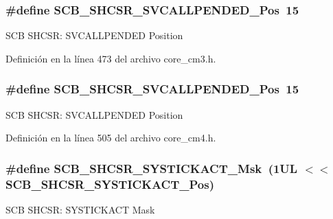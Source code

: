 \subsubsection[{\texorpdfstring{S\+C\+B\+\_\+\+S\+H\+C\+S\+R\+\_\+\+S\+V\+C\+A\+L\+L\+P\+E\+N\+D\+E\+D\+\_\+\+Pos}{SCB_SHCSR_SVCALLPENDED_Pos}}]{\setlength{\rightskip}{0pt plus 5cm}\#define S\+C\+B\+\_\+\+S\+H\+C\+S\+R\+\_\+\+S\+V\+C\+A\+L\+L\+P\+E\+N\+D\+E\+D\+\_\+\+Pos~15}\hypertarget{group___c_m_s_i_s___s_c_b_ga2f93ec9b243f94cdd3e94b8f0bf43641}{}\label{group___c_m_s_i_s___s_c_b_ga2f93ec9b243f94cdd3e94b8f0bf43641}
S\+CB S\+H\+C\+SR\+: S\+V\+C\+A\+L\+L\+P\+E\+N\+D\+ED Position 

Definición en la línea 473 del archivo core\+\_\+cm3.\+h.

\subsubsection[{\texorpdfstring{S\+C\+B\+\_\+\+S\+H\+C\+S\+R\+\_\+\+S\+V\+C\+A\+L\+L\+P\+E\+N\+D\+E\+D\+\_\+\+Pos}{SCB_SHCSR_SVCALLPENDED_Pos}}]{\setlength{\rightskip}{0pt plus 5cm}\#define S\+C\+B\+\_\+\+S\+H\+C\+S\+R\+\_\+\+S\+V\+C\+A\+L\+L\+P\+E\+N\+D\+E\+D\+\_\+\+Pos~15}\hypertarget{group___c_m_s_i_s___s_c_b_ga2f93ec9b243f94cdd3e94b8f0bf43641}{}\label{group___c_m_s_i_s___s_c_b_ga2f93ec9b243f94cdd3e94b8f0bf43641}
S\+CB S\+H\+C\+SR\+: S\+V\+C\+A\+L\+L\+P\+E\+N\+D\+ED Position 

Definición en la línea 505 del archivo core\+\_\+cm4.\+h.

\subsubsection[{\texorpdfstring{S\+C\+B\+\_\+\+S\+H\+C\+S\+R\+\_\+\+S\+Y\+S\+T\+I\+C\+K\+A\+C\+T\+\_\+\+Msk}{SCB_SHCSR_SYSTICKACT_Msk}}]{\setlength{\rightskip}{0pt plus 5cm}\#define S\+C\+B\+\_\+\+S\+H\+C\+S\+R\+\_\+\+S\+Y\+S\+T\+I\+C\+K\+A\+C\+T\+\_\+\+Msk~(1\+U\+L $<$$<$ S\+C\+B\+\_\+\+S\+H\+C\+S\+R\+\_\+\+S\+Y\+S\+T\+I\+C\+K\+A\+C\+T\+\_\+\+Pos)}\hypertarget{group___c_m_s_i_s___s_c_b_gafef530088dc6d6bfc9f1893d52853684}{}\label{group___c_m_s_i_s___s_c_b_gafef530088dc6d6bfc9f1893d52853684}
S\+CB S\+H\+C\+SR\+: S\+Y\+S\+T\+I\+C\+K\+A\+CT Mask 

